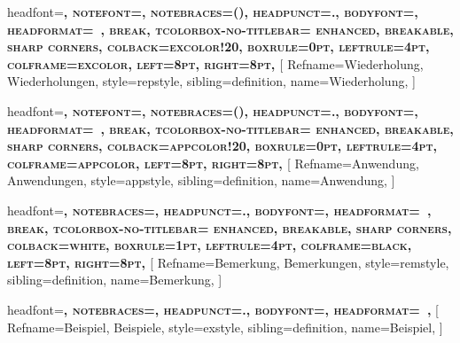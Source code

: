 {
headfont=\normalfont\scshape\bfseries,
notefont=\normalfont\bfseries,
notebraces={(}{)},  %
headpunct={.},
bodyfont=\normalfont,
headformat=\NAME~\NUMBER\NOTE,
break,
tcolorbox-no-titlebar={
    enhanced,
    breakable,
    sharp corners,
    colback=excolor!20,
    boxrule=0pt,
    leftrule=4pt,       
    colframe=excolor,
    left=8pt,
    right=8pt,
  }
}
[
  Refname={Wiederholung, Wiederholungen},
  style=repstyle, 
  sibling=definition,
  name=Wiederholung,
]

{
headfont=\normalfont\scshape\bfseries,
notefont=\normalfont\bfseries,
notebraces={(}{)},  %
headpunct={.},
bodyfont=\normalfont,
headformat=\NAME~\NUMBER\NOTE,
break,
tcolorbox-no-titlebar={
    enhanced,
    breakable,
    sharp corners,
    colback=appcolor!20,
    boxrule=0pt,
    leftrule=4pt,       
    colframe=appcolor,
    left=8pt,
    right=8pt,
  }
}
[
  Refname={Anwendung, Anwendungen},
  style=appstyle, 
  sibling=definition,
  name=Anwendung,
]

{
headfont=\normalfont\bfseries\scshape,
notebraces={}{},
headpunct={.},
bodyfont=\normalfont,
headformat=\NAME~\NUMBER\NOTE,
break,
tcolorbox-no-titlebar={
    enhanced,
    breakable,
    sharp corners,
    colback=white,
    boxrule=1pt,  
    leftrule=4pt,    
    colframe=black,
    left=8pt,
    right=8pt,
  }
}
[
  Refname={Bemerkung, Bemerkungen},
  style=remstyle,
  sibling=definition,
  name=Bemerkung,
]

{
headfont=\normalfont\bfseries\scshape,
notebraces={}{},
headpunct={.},
bodyfont=\normalfont,
headformat=\NAME~\NUMBER\NOTE,
}
[
  Refname={Beispiel, Beispiele},
  style=exstyle,  
  sibling=definition,
  name=Beispiel,
]

\automark*[section]{}

\clearpairofpagestyles
\rohead{%
  \headmark\quad
  \makebox[0pt][l]{%
    \makebox[\marginparsep][r]{%
    \raisebox{0pt}[\ht\strutbox][\dp\strutbox]{%
      \rule[-\dp\strutbox]{1pt}{\dimexpr 1in+\topmargin+\headheight+7mm}%
      }%
    \nobreakspace
    }%
    \makebox[\marginparwidth][l]{\footnotesize\pagemark}%
  }%
}
\lehead{%
  \makebox[0pt][r]{%
    \makebox[0pt][r]{\footnotesize\pagemark}%
    \makebox[\marginparsep][l]{%
      \nobreakspace
      \raisebox{0pt}[\ht\strutbox][\dp\strutbox]{%
        \rule[-\dp\strutbox]{1pt}{\dimexpr 1in+\topmargin+\headheight+7mm}%
      }%
    }%
  }%
  \quad\headmark
}

